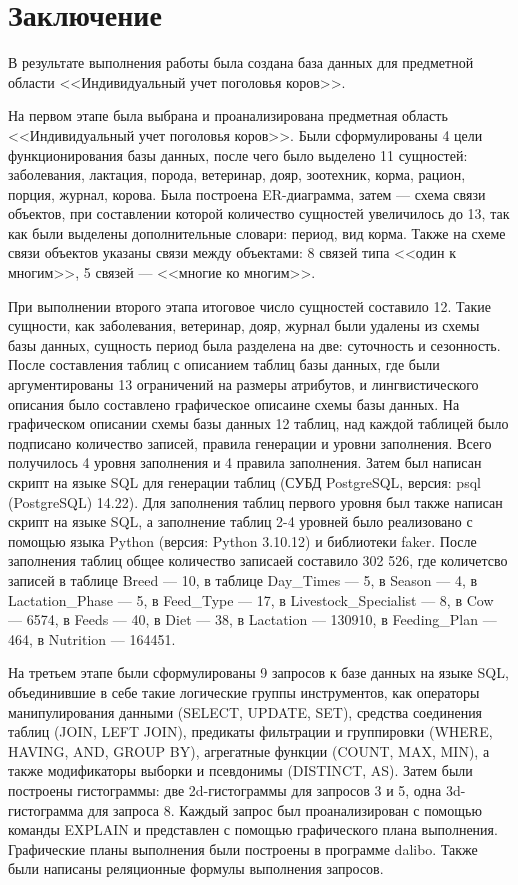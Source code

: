 

\section*{Заключение}
В результате выполнения работы была создана база данных для предметной области <<Индивидуальный учет поголовья коров>>.

На первом этапе была выбрана и проанализирована предметная область <<Индивидуальный учет поголовья коров>>. Были сформулированы 4 цели функционирования базы данных, после чего было выделено 11 сущностей: заболевания, лактация, порода, ветеринар, дояр, зоотехник, корма, рацион, порция, журнал, корова. Была построена ER-диаграмма, затем --- схема связи объектов, при составлении которой количество сущностей увеличилось до 13, так как были выделены дополнительные словари: период, вид корма. Также на схеме связи объектов указаны связи между объектами: 8 связей типа <<один к многим>>, 5 связей --- <<многие ко многим>>.

При выполнении второго этапа итоговое число сущностей составило 12. Такие сущности, как заболевания, ветеринар, дояр, журнал были удалены из схемы базы данных, сущность период была разделена на две: суточность и сезонность. После составления таблиц с описанием таблиц базы данных, где были аргументированы 13 ограничений на размеры атрибутов, и лингвистического описания было составлено графическое описаине схемы базы данных. На графическом описании схемы базы данных 12 таблиц, над каждой таблицей было подписано количество записей, правила генерации и уровни заполнения. Всего получилось 4 уровня заполнения и 4 правила заполнения. Затем был написан скрипт на языке SQL для генерации таблиц (СУБД PostgreSQL, версия: psql (PostgreSQL) 14.22). Для заполнения таблиц первого уровня был также написан скрипт на языке SQL, а заполнение таблиц 2-4 уровней было реализовано с помощью языка Python (версия: Python 3.10.12) и библиотеки faker. После заполнения таблиц общее количество записаей составило 302 526, где количетсво записей в таблице Breed --- 10, в таблице Day\_Times --- 5, в Season --- 4, в Lactation\_Phase --- 5, в Feed\_Type --- 17, в Livestock\_Specialist --- 8, в Cow --- 6574, в Feeds --- 40, в Diet --- 38, в Lactation --- 130910, в Feeding\_Plan --- 464, в Nutrition --- 164451.

На третьем этапе были сформулированы 9 запросов к базе данных на языке SQL, объединившие в себе такие логические группы инструментов, как операторы манипулирования данными (SELECT, UPDATE, SET), средства соединения таблиц (JOIN, LEFT JOIN), предикаты фильтрации и группировки (WHERE, HAVING, AND, GROUP BY), агрегатные функции (COUNT, MAX, MIN), а также модификаторы выборки и псевдонимы (DISTINCT, AS). Затем были построены гистограммы: две 2d-гистограммы для запросов 3 и 5, одна 3d-гистограмма для запроса 8.  Каждый запрос был проанализирован с помощью команды EXPLAIN и представлен с помощью графического плана выполнения. Графические планы выполнения были построены в программе dalibo. Также были написаны реляционные формулы выполнения запросов.